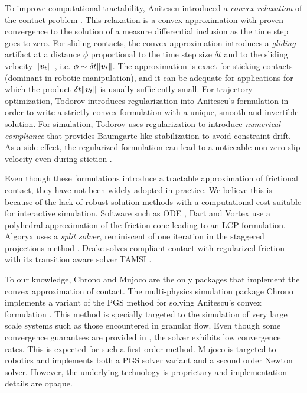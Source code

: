 To improve computational tractability, Anitescu introduced a \textit{convex
relaxation} of the contact problem \cite{bib:anitescu2006}. This relaxation is a
convex approximation with proven convergence to the solution of a measure
differential inclusion as the time step goes to zero. For sliding contacts, the
convex approximation introduces a \emph{gliding} artifact at a distance $\phi$
proportional to the time step size $\delta t$ and to the sliding velocity
$\Vert{\bm{v}}_t\Vert$ \cite{bib:mazhar2014}, i.e. $\phi\sim \delta
t\Vert{\bm{v}}_t\Vert$. The approximation is exact for sticking contacts (dominant
in robotic manipulation), and it can be adequate for applications for which the
product $\delta t\Vert{\bm{v}}_t\Vert$ is usually sufficiently small. For
trajectory optimization, Todorov \cite{bib:todorov2011} introduces
regularization into Anitescu's formulation in order to write a strictly convex
formulation with a unique, smooth and invertible solution. For simulation,
Todorov \cite{bib:todorov2014} uses regularization to introduce \emph{numerical
compliance} that provides Baumgarte-like stabilization to avoid constraint
drift. As a side effect, the regularized formulation can lead to a noticeable
non-zero slip velocity even during stiction \cite{bib:simbenchmark}.

Even though these formulations introduce a tractable approximation of frictional
contact, they have not been widely adopted in practice. We believe this is
because of the lack of robust solution methods with a computational cost
suitable for interactive simulation. Software such as ODE \cite{bib:ode}, Dart
\cite{bib:dart} and Vortex \cite{bib:vortex} use a polyhedral approximation of
the friction cone leading to an LCP formulation. Algoryx \cite{bib:algoryx} uses
a \emph{split solver}, reminiscent of one iteration in the staggered projections
method \cite{bib:Kaufman2008}. Drake \cite{bib:drake} solves compliant contact
with regularized friction with its transition aware solver TAMSI
\cite{bib:castro2020}. 

To our knowledge, Chrono \cite{bib:hrono2016} and Mujoco \cite{bib:mujoco} are
the only packages that implement the convex approximation of contact. The
multi-physics simulation package Chrono implements a variant of the PGS method
for solving Anitescu's convex formulation \cite{bib:tasora2011}. This method is
specially targeted to the simulation of very large scale systems such as those
encountered in granular flow. Even though some convergence guarantees are
provided in \cite{bib:anitescu2010}, the solver exhibits low convergence rates.
This is expected for such a first order method. Mujoco is targeted to robotics
and implements both a PGS solver variant \cite{bib:todorov2014} and a second
order Newton solver. However, the underlying technology is proprietary and
implementation details are opaque.

